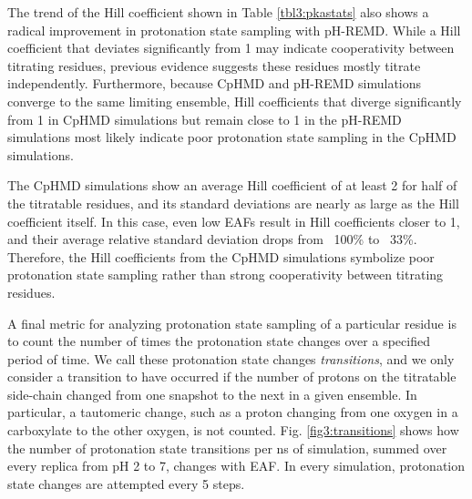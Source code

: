 The trend of the Hill coefficient shown in Table \ref{tbl3:pkastats} also shows
a radical improvement in protonation state sampling with pH-REMD.  While a Hill
coefficient that deviates significantly from 1 may indicate cooperativity
between titrating residues, previous evidence suggests these residues mostly
titrate independently.  \cite{Mongan2004}  Furthermore, because CpHMD and
pH-REMD simulations converge to the same limiting ensemble, Hill coefficients
that diverge significantly from 1 in CpHMD simulations but remain close to 1 in
the pH-REMD simulations most likely indicate poor protonation state sampling in
the CpHMD simulations.

The CpHMD simulations show an average Hill coefficient of at least 2 for half of
the titratable residues, and its standard deviations are nearly as large as the
Hill coefficient itself. In this case, even low EAFs result in Hill coefficients
closer to 1, and their average relative standard deviation drops from ~100\% to
~33\%.  Therefore, the Hill coefficients from the CpHMD simulations symbolize
poor protonation state sampling rather than strong cooperativity between
titrating residues.

A final metric for analyzing protonation state sampling of a particular residue
is to count the number of times the protonation state changes over a specified
period of time.  We call these protonation state changes \emph{transitions}, and
we only consider a transition to have occurred if the number of protons on the
titratable side-chain changed from one snapshot to the next in a given ensemble.
In particular, a tautomeric change, such as a proton changing from one oxygen in
a carboxylate to the other oxygen, is not counted. Fig. \ref{fig3:transitions}
shows how the number of protonation state transitions per ns of simulation,
summed over every replica from pH 2 to 7, changes with EAF.  In every
simulation, protonation state changes are attempted every 5 steps.

